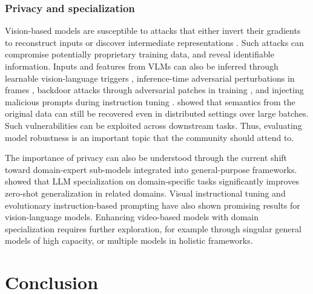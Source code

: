 \subsubsection{Privacy and specialization}
\label{sec:directions::efficiency:::privacy}


Vision-based models are susceptible to attacks that either invert their gradients to reconstruct inputs  or discover intermediate representations . Such attacks can compromise potentially proprietary training data, and reveal identifiable information. Inputs and features from VLMs can also be inferred through learnable vision-language triggers , inference-time adversarial perturbations in frames , backdoor attacks through adversarial patches in training , and injecting malicious prompts during instruction tuning .  showed that semantics from the original data can still be recovered even in distributed settings over large batches. Such vulnerabilities can be exploited across downstream tasks. Thus, evaluating model robustness is an important topic that the community should attend to.

The importance of privacy can also be understood through the current shift toward domain-expert sub-models integrated into general-purpose frameworks.  showed that LLM specialization on domain-specific tasks significantly improves zero-shot generalization in related domains. Visual instructional tuning  and evolutionary instruction-based prompting  have also shown promising results for vision-language models. Enhancing video-based models with domain specialization requires further exploration, for example through singular general models of high capacity, or multiple models in holistic frameworks.


\section{Conclusion}
\label{sec:conclusion}

